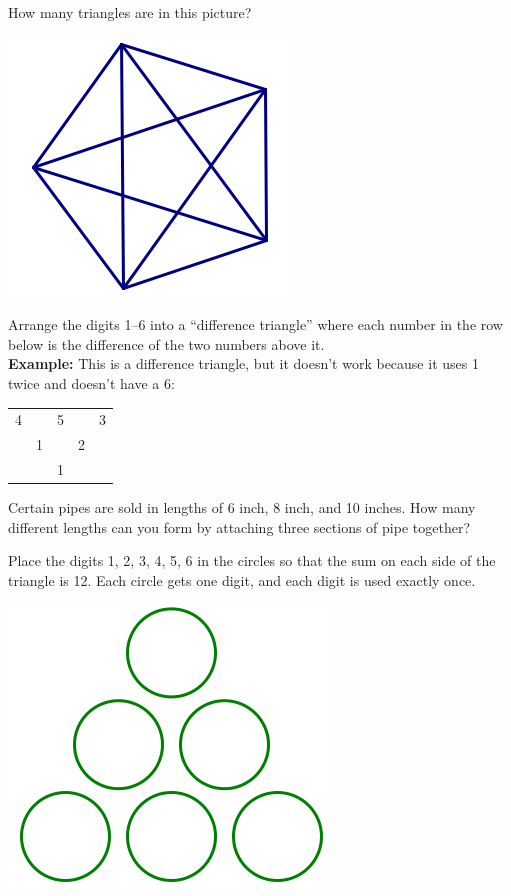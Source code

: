 \begin{problem}
How many triangles are in this picture?
\begin{center}
\includegraphics[height=3 cm]{../Pictures/ProbSolvingPics/pent_tris}
\end{center}


\end{problem}

\begin{problem}
Arrange the digits 1--6 into a ``difference triangle'' where each number in the row below is the difference of the two numbers above it.\\
{\bf Example:} This is a difference triangle, but it doesn't work because it uses 1 twice and doesn't have a 6:

\begin{center}
\begin{tabular}{c c c c c}
4 && 5 && 3 \\
 & 1 && 2\\
 &&1 \\
 \end{tabular}
 \end{center}
\end{problem}


\begin{problem}
Certain pipes are sold in lengths of 6 inch, 8 inch, and 10 inches.  How many different lengths can you form by attaching three sections of pipe together?
\end{problem}

\begin{problem}
Place the digits 1, 2, 3, 4, 5, 6 in the circles so that the sum on each side of the triangle is 12.  Each circle gets one digit, and each digit is used exactly once.
\begin{center}
\includegraphics[height=3 cm]{../Pictures/ProbSolvingPics/circle_pyr}
\end{center}

\end{problem}


